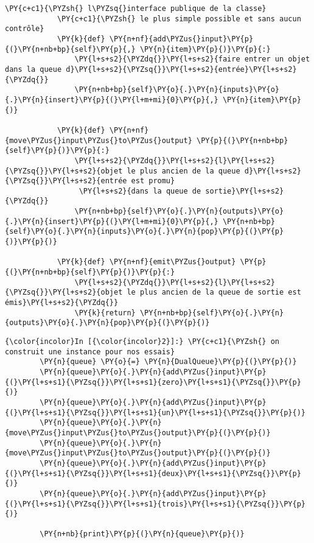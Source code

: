\begin{Verbatim}[commandchars=\\\{\}]
            \PY{c+c1}{\PYZsh{} l\PYZsq{}interface publique de la classe}
            \PY{c+c1}{\PYZsh{} le plus simple possible et sans aucun contrôle}
            \PY{k}{def} \PY{n+nf}{add\PYZus{}input}\PY{p}{(}\PY{n+nb+bp}{self}\PY{p}{,} \PY{n}{item}\PY{p}{)}\PY{p}{:}
                \PY{l+s+s2}{\PYZdq{}}\PY{l+s+s2}{faire entrer un objet dans la queue d}\PY{l+s+s2}{\PYZsq{}}\PY{l+s+s2}{entrée}\PY{l+s+s2}{\PYZdq{}}
                \PY{n+nb+bp}{self}\PY{o}{.}\PY{n}{inputs}\PY{o}{.}\PY{n}{insert}\PY{p}{(}\PY{l+m+mi}{0}\PY{p}{,} \PY{n}{item}\PY{p}{)}
                
            \PY{k}{def} \PY{n+nf}{move\PYZus{}input\PYZus{}to\PYZus{}output} \PY{p}{(}\PY{n+nb+bp}{self}\PY{p}{)}\PY{p}{:}
                \PY{l+s+s2}{\PYZdq{}}\PY{l+s+s2}{l}\PY{l+s+s2}{\PYZsq{}}\PY{l+s+s2}{objet le plus ancien de la queue d}\PY{l+s+s2}{\PYZsq{}}\PY{l+s+s2}{entrée est promu}
                 \PY{l+s+s2}{dans la queue de sortie}\PY{l+s+s2}{\PYZdq{}}
                \PY{n+nb+bp}{self}\PY{o}{.}\PY{n}{outputs}\PY{o}{.}\PY{n}{insert}\PY{p}{(}\PY{l+m+mi}{0}\PY{p}{,} \PY{n+nb+bp}{self}\PY{o}{.}\PY{n}{inputs}\PY{o}{.}\PY{n}{pop}\PY{p}{(}\PY{p}{)}\PY{p}{)}
                
            \PY{k}{def} \PY{n+nf}{emit\PYZus{}output} \PY{p}{(}\PY{n+nb+bp}{self}\PY{p}{)}\PY{p}{:}
                \PY{l+s+s2}{\PYZdq{}}\PY{l+s+s2}{l}\PY{l+s+s2}{\PYZsq{}}\PY{l+s+s2}{objet le plus ancien de la queue de sortie est émis}\PY{l+s+s2}{\PYZdq{}}
                \PY{k}{return} \PY{n+nb+bp}{self}\PY{o}{.}\PY{n}{outputs}\PY{o}{.}\PY{n}{pop}\PY{p}{(}\PY{p}{)}
\end{Verbatim}


    \begin{Verbatim}[commandchars=\\\{\}]
{\color{incolor}In [{\color{incolor}2}]:} \PY{c+c1}{\PYZsh{} on construit une instance pour nos essais}
        \PY{n}{queue} \PY{o}{=} \PY{n}{DualQueue}\PY{p}{(}\PY{p}{)}
        \PY{n}{queue}\PY{o}{.}\PY{n}{add\PYZus{}input}\PY{p}{(}\PY{l+s+s1}{\PYZsq{}}\PY{l+s+s1}{zero}\PY{l+s+s1}{\PYZsq{}}\PY{p}{)}
        \PY{n}{queue}\PY{o}{.}\PY{n}{add\PYZus{}input}\PY{p}{(}\PY{l+s+s1}{\PYZsq{}}\PY{l+s+s1}{un}\PY{l+s+s1}{\PYZsq{}}\PY{p}{)}
        \PY{n}{queue}\PY{o}{.}\PY{n}{move\PYZus{}input\PYZus{}to\PYZus{}output}\PY{p}{(}\PY{p}{)}
        \PY{n}{queue}\PY{o}{.}\PY{n}{move\PYZus{}input\PYZus{}to\PYZus{}output}\PY{p}{(}\PY{p}{)}
        \PY{n}{queue}\PY{o}{.}\PY{n}{add\PYZus{}input}\PY{p}{(}\PY{l+s+s1}{\PYZsq{}}\PY{l+s+s1}{deux}\PY{l+s+s1}{\PYZsq{}}\PY{p}{)}
        \PY{n}{queue}\PY{o}{.}\PY{n}{add\PYZus{}input}\PY{p}{(}\PY{l+s+s1}{\PYZsq{}}\PY{l+s+s1}{trois}\PY{l+s+s1}{\PYZsq{}}\PY{p}{)}
        
        \PY{n+nb}{print}\PY{p}{(}\PY{n}{queue}\PY{p}{)}
\end{Verbatim}


